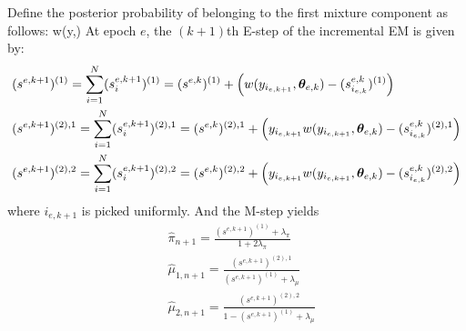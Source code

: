 Define the posterior probability of belonging to the first mixture component as follows:
\beq
w(y,\prm) \eqdef    {}
\eeq
At epoch $e$, the $(k+1)$th E-step of the incremental EM is given by:
\begin{align*}
    & (s^{e,k+1})^{(1)} = \sum_{i=1}^N (s_i^{e,k+1})^{(1)}  = (s^{e,k})^{(1)}+ \left(w(y_{i_{e,k+1}},\bm{\theta}_{e,k})-(s_{i_{e,k}}^{e,k})^{(1)}\right)\\
    & (s^{e,k+1})^{(2),1} = \sum_{i=1}^N (s_i^{e,k+1})^{(2),1}  = (s^{e,k})^{(2),1}+ \left(y_{i_{e,k+1}}w(y_{i_{e,k+1}},\bm{\theta}_{e,k})-(s_{i_{e,k}}^{e,k})^{(2),1}\right)\\
    & (s^{e,k+1})^{(2),2} = \sum_{i=1}^N (s_i^{e,k+1})^{(2),2}  = (s^{e,k})^{(2),2}+ \left(y_{i_{e,k+1}}w(y_{i_{e,k+1}},\bm{\theta}_{e,k})-(s_{i_{e,k}}^{e,k})^{(2),2}\right)\\
\end{align*}
where $i_{e,k+1}$ is picked uniformly. And the M-step yields
\begin{align*}
    & \hat{\pi}_{n+1} =  \frac{(s^{e,k+1})^{(1)}+ \lambda_{\pi}}{1 + 2\lambda_{\pi}}   \\
    & \hat{\mu}_{1,n+1} =\frac{(s^{e,k+1})^{(2),1}}{(s^{e,k+1})^{(1)} + \lambda_{\mu}} \\
       & \hat{\mu}_{2,n+1} =\frac{(s^{e,k+1})^{(2),2}}{1-(s^{e,k+1})^{(1)}+ \lambda_{\mu}}
\end{align*}
\clearpage 
